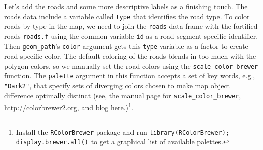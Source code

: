 \documentclass[12pt,oneside]{book}\usepackage[]{graphicx}\usepackage[]{color}
\begin{document}
Let's add the roads and some more descriptive labels as a finishing touch. The roads data include a variable called \verb+type+ that identifies the road type. To color roads by type in the map, we need to join the \verb+roads+ data frame with the fortified roads \verb+roads.f+ using the common variable \verb+id+ as a road segment specific identifier. Then \verb+geom_path+'s \verb+color+ argument gets this \verb+type+ variable as a factor to create road-specific color. The default coloring of the roads blends in too much with the polygon colors, so we manually set the road colors using the \verb+scale_color_brewer+ function. The \verb+palette+ argument in this function accepts a set of key words, e.g., \verb+"Dark2"+, that specify sets of diverging colors chosen to make map object difference optimally distinct (see, the manual page for \verb+scale_color_brewer+, \url{http://colorbrewer2.org}, and blog \href{https://www.r-bloggers.com/r-using-rcolorbrewer-to-colour-your-figures-in-r}{here}.)\footnote{Install the \texttt{RColorBrewer} package and run \texttt{library(RColorBrewer); display.brewer.all()} to get a graphical list of available palettes.}.
\end{document}
